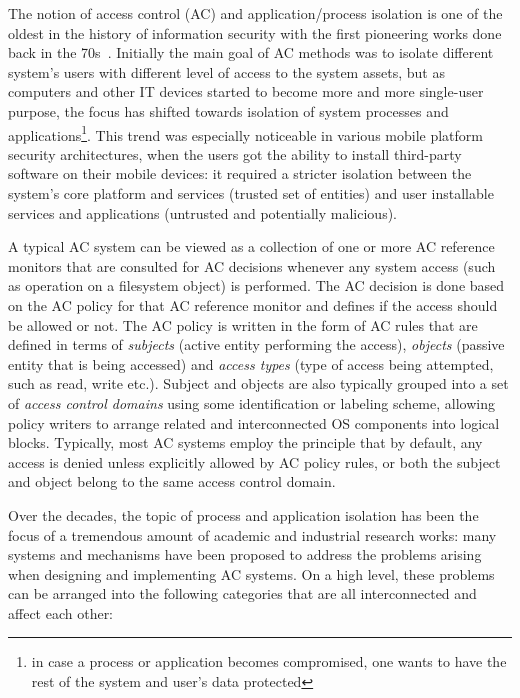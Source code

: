 
The notion of access control (AC) and application/process isolation is one of the oldest in the history of information security with the first pioneering works done back in the 70s~\cite{saltzer75, Denning76}. Initially the main goal of AC methods was to isolate different system's users with different level of access to the system assets, but as computers and other IT devices started to become more and more single-user purpose, the focus has shifted towards isolation of system processes and applications\footnote{in case a process or application becomes compromised, one wants to have the rest of the system and user's data protected}.
 This trend was especially noticeable in various mobile platform security architectures, when the users got the ability to install third-party software on their mobile devices: it required a stricter isolation between the system's core platform and services (trusted set of entities) and user installable services and applications (untrusted and potentially malicious).

A typical AC system can be viewed as a collection of one or more AC reference monitors that are consulted for AC decisions whenever any system access (such as operation on a filesystem object) is performed. The AC decision is done based on the AC policy for that AC reference monitor and defines if the access should be allowed or not. The AC policy is written in the form of AC rules that are defined in terms of \textit{subjects} (active entity performing the access), \textit{objects} (passive entity that is being accessed) and \textit{access types} (type of access being attempted, such as read, write etc.). Subject and objects are also typically grouped into a set of \textit{access control domains} using some identification or labeling scheme, allowing policy writers to arrange related and interconnected OS components into logical blocks. Typically, most AC systems employ the principle that by default, any access is denied unless explicitly allowed by AC policy rules, or both the subject and object belong to the same access control domain.
 
Over the decades, the topic of process and application isolation has been the focus of a tremendous amount of academic and industrial research works: many systems and mechanisms have been proposed to address the problems arising when designing and implementing AC systems. On a high level, these problems can be arranged into the following categories that are all interconnected and affect each other: 


